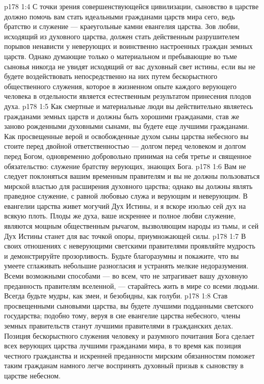 \vs p178 1:4 С точки зрения совершенствующейся цивилизации, сыновство в царстве должно помочь вам стать идеальными гражданами царств мира сего, ведь братство и служение --- краеугольные камни евангелия царства. Зов любви, исходящий из духовного царства, должен стать действенным разрушителем порывов ненависти у неверующих и воинственно настроенных граждан земных царств. Однако думающие только о материальном и пребывающие во тьме сыновья никогда не увидят исходящий от вас духовный свет истины, если вы не будете воздействовать непосредственно на них путем бескорыстного общественного служения, которое в жизненном опыте каждого верующего человека в отдельности является естественным результатом принесения плодов духа.
\vs p178 1:5 Как смертные и материальные люди вы действительно являетесь гражданами земных царств и должны быть хорошими гражданами, став же заново рожденными духовными сынами, вы будете еще лучшими гражданами. Как просвещенные верой и освобожденные духом сыны царства небесного вы стоите перед двойной ответственностью --- долгом перед человеком и долгом перед Богом, одновременно добровольно принимая на себя третье и священное обязательство: служение братству верующих, знающих Бога.
\vs p178 1:6 Вам не следует поклоняться вашим временным правителям и вы не должны пользоваться мирской властью для расширения духовного царства; однако вы должны являть праведное служение, с равной любовью служа и верующим и неверующим. В евангелии царства живет могучий Дух Истины, и я вскоре изолью сей дух на всякую плоть. Плоды же духа, ваше искреннее и полное любви служение, являются мощным общественным рычагом, вызволяющим народы из тьмы, и сей Дух Истины станет для вас точкой опоры, приумножающей силы.
\vs p178 1:7 В своих отношениях с неверующими светскими правителями проявляйте мудрость и демонстрируйте прозорливость. Будьте благоразумны и покажите, что вы умеете сглаживать небольшие разногласия и устранять мелкие недоразумения. Всеми возможными способами --- во всем, что не затрагивает вашу духовную преданность правителям вселенной, --- старайтесь жить в мире со всеми людьми. Всегда будьте мудры, как змеи, и безобидны, как голуби.
\vs p178 1:8 Став просвещенными сыновьями царства, вы будете лучшими подданными светского государства; подобно тому, веруя в сие евангелие царства небесного, члены земных правительств станут лучшими правителями в гражданских делах. Позиция бескорыстного служения человеку и разумного почитания Бога сделает всех верующих царства лучшими гражданами мира, в то время как позиция честного гражданства и искренней преданности мирским обязанностям поможет таким гражданам намного легче воспринять духовный призыв к сыновству в царстве небесном.
